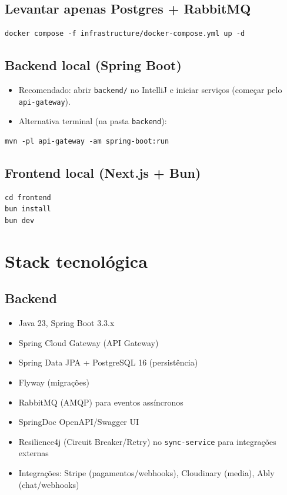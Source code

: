 \documentclass[11pt,a4paper]{article}
\begin{document}
\subsection{Levantar apenas Postgres + RabbitMQ}
\begin{verbatim}
docker compose -f infrastructure/docker-compose.yml up -d
\end{verbatim}

\subsection{Backend local (Spring Boot)}
\begin{itemize}[nosep]
  \item Recomendado: abrir \texttt{backend/} no IntelliJ e iniciar serviços (começar pelo \texttt{api-gateway}).
  \item Alternativa terminal (na pasta \texttt{backend}):
\end{itemize}
\begin{verbatim}
mvn -pl api-gateway -am spring-boot:run
\end{verbatim}

\subsection{Frontend local (Next.js + Bun)}
\begin{verbatim}
cd frontend
bun install
bun dev
\end{verbatim}

\section{Stack tecnológica}
\subsection{Backend}
\begin{itemize}[nosep]
  \item Java 23, Spring Boot 3.3.x
  \item Spring Cloud Gateway (API Gateway)
  \item Spring Data JPA + PostgreSQL 16 (persistência)
  \item Flyway (migrações)
  \item RabbitMQ (AMQP) para eventos assíncronos
  \item SpringDoc OpenAPI/Swagger UI
  \item Resilience4j (Circuit Breaker/Retry) no \texttt{sync-service} para integrações externas
  \item Integrações: Stripe (pagamentos/webhooks), Cloudinary (media), Ably (chat/webhooks)
\end{itemize}
\end{document}
